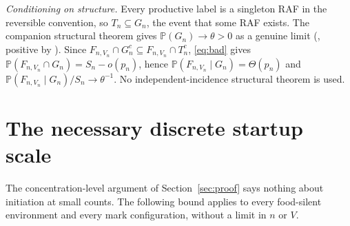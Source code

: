 \documentclass[11pt,letterpaper]{article}
\theoremstyle{plain}
\theoremstyle{definition}
\theoremstyle{remark}
\numberwithin{equation}{section}
\newcommand{\PP}{\mathbb P}
\begin{document}
\emph{Conditioning on structure.} Every productive label is a singleton RAF in the reversible convention, so $T_n\subseteq G_n$, the event that some RAF exists. The companion structural theorem gives $\PP(G_n)\to\theta>0$ as a genuine limit (, positive by ). Since $F_{n,V_n}\cap G_n^c\subseteq F_{n,V_n}\cap T_n^c$, \eqref{eq:bad} gives $\PP(F_{n,V_n}\cap G_n)=S_n-o(p_n)$, hence $\PP(F_{n,V_n}\mid G_n)=\Theta(p_n)$ and $\PP(F_{n,V_n}\mid G_n)/S_n\to\theta^{-1}$. No independent-incidence structural theorem is used.

\section{The necessary discrete startup scale}\label{sec:startup}

The concentration-level argument of Section~\ref{sec:proof} says nothing about initiation at small counts. The following bound applies to every food-silent environment and every mark configuration, without a limit in $n$ or $V$.
\end{document}
